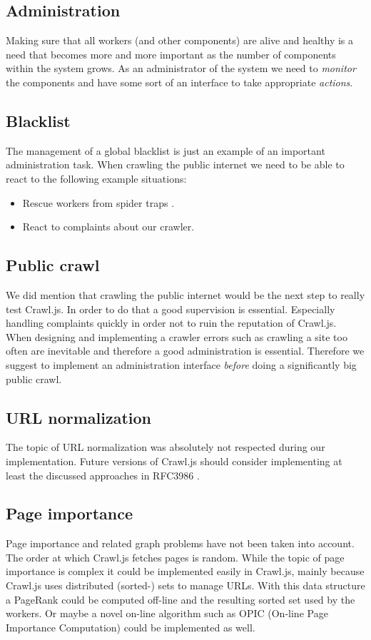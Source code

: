 \subsection{Administration}
Making sure that all workers (and other components) are alive and healthy is a need that becomes more and more important as the number of components within the system grows. As an administrator of the system we need to \emph{monitor} the components and have some sort of an interface to take appropriate \emph{actions}.

\subsection{Blacklist}
The management of a global blacklist is just an example of an important administration task. When crawling the public internet we need to be able to react to the following example situations:
\begin{itemize}
  \item Rescue workers from spider traps \cite{wiki:spider_trap}.
  \item React to complaints about our crawler.
\end{itemize}

\subsection{Public crawl}
We did mention that crawling the public internet would be the next step to really test Crawl.js. In order to do that a good supervision is essential. Especially handling complaints quickly in order not to ruin the reputation of Crawl.js. When designing and implementing a crawler errors such as crawling a site too often are inevitable and therefore a good administration is essential. Therefore we suggest to implement an administration interface \emph{before} doing a significantly big public crawl.

\subsection{URL normalization}
The topic of URL normalization \cite{wiki:url_normalization} was absolutely not respected during our implementation. Future versions of Crawl.js should consider implementing at least the discussed approaches in RFC3986 \cite{rfc:url_normalization}.

\subsection{Page importance}
Page importance and related graph problems have not been taken into account. The order at which Crawl.js fetches pages is random. While the topic of page importance is complex it could be implemented easily in Crawl.js, mainly because Crawl.js uses distributed (sorted-) sets to manage URLs. With this data structure a PageRank\cite{google} could be computed off-line and the resulting sorted set used by the workers. Or maybe a novel on-line algorithm such as OPIC (On-line Page Importance Computation) \cite{page_importance1} could be implemented as well.
